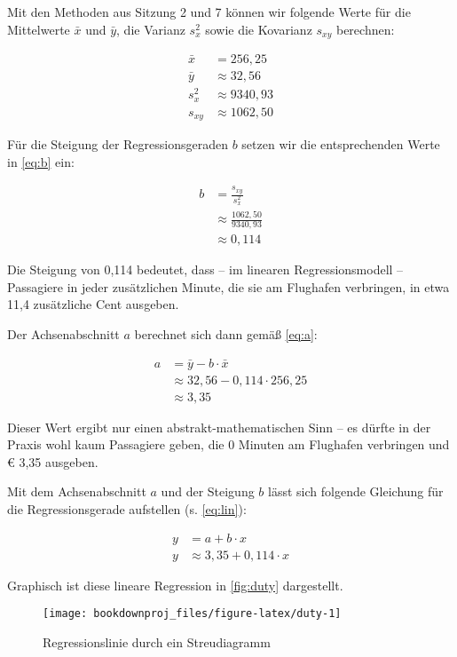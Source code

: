 \documentclass[
  ngerman,
]{article}
\begin{document}
Mit den Methoden aus Sitzung 2 und 7 können wir folgende Werte für die Mittelwerte \(\bar{x}\) und \(\bar{y}\), die Varianz \(s^2_x\) sowie die Kovarianz \(s_{xy}\) berechnen:

\[\begin{aligned}
\bar{x}&=256,25\\
\bar{y}&\approx 32,56\\
s^2_{x}&\approx9340,93\\
s_{xy}&\approx 1062,50
\end{aligned}\]

Für die Steigung der Regressionsgeraden \(b\) setzen wir die entsprechenden Werte in \autoref{eq:b} ein:

\nopagebreak

\[\begin{aligned}
b&=\frac{s_{xy}}{s^2_x}\\[5pt]
 &\approx\frac{1062,50}{9340,93}\\[4pt]
 &\approx0,114
\end{aligned}\]

Die Steigung von 0,114 bedeutet, dass -- im linearen Regressionsmodell -- Passagiere in jeder zusätzlichen Minute, die sie am Flughafen verbringen, in etwa 11,4 zusätzliche Cent ausgeben.

Der Achsenabschnitt \(a\) berechnet sich dann gemäß \autoref{eq:a}:

\nopagebreak

\[\begin{aligned}
a&=\bar{y}-b\cdot\bar{x}\\
&\approx 32,56-0,114\cdot256,25\\
&\approx 3,35
\end{aligned}\]

Dieser Wert ergibt nur einen abstrakt-mathematischen Sinn -- es dürfte in der Praxis wohl kaum Passagiere geben, die 0 Minuten am Flughafen verbringen und € 3,35 ausgeben.

Mit dem Achsenabschnitt \(a\) und der Steigung \(b\) lässt sich folgende Gleichung für die Regressionsgerade aufstellen (s. \autoref{eq:lin}):

\[\begin{aligned}
y&=a+b\cdot x\\
y&\approx3,35 + 0,114 \cdot x
\end{aligned}\]

Graphisch ist diese lineare Regression in \autoref{fig:duty} dargestellt.

\begin{figure}[h]

{\centering \texttt{[image: bookdownproj\_files/figure-latex/duty-1]} 

}

\caption{Regressionslinie durch ein Streudiagramm}\label{fig:duty}
\end{figure}
\end{document}
